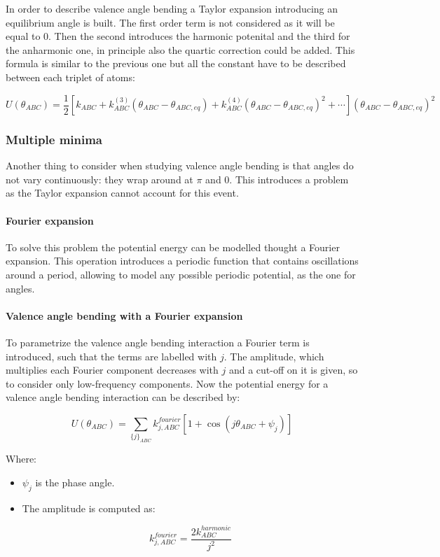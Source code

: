 	In order to describe valence angle bending a Taylor expansion introducing an equilibrium angle is built.
	The first order term is not considered as it will be equal to $0$.
	Then the second introduces the harmonic potenital and the third for the anharmonic one, in principle also the quartic correction could be added.
	This formula is similar to the previous one but all the constant have to be described between each triplet of atoms:

	$$U(\theta_{ABC}) = \frac{1}{2}[k_{ABC}+k^{(3)}_{ABC}(\theta_{ABC}-\theta_{ABC,eq})+k^{(4)}_{ABC}(\theta_{ABC}-\theta_{ABC,eq})^2+\cdots](\theta_{ABC}-\theta_{ABC, eq})^2$$

		\subsubsection{Multiple minima}
		Another thing to consider when studying valence angle bending is that angles do not vary continuously: they wrap around at $\pi$ and $0$.
		This introduces a problem as the Taylor expansion cannot account for this event.

			\paragraph{Fourier expansion}
			To solve this problem the potential energy can be modelled thought a Fourier expansion.
			This operation introduces a periodic function that contains oscillations around a period, allowing to model any possible periodic potential, as the one for angles.

			\paragraph{Valence angle bending with a Fourier expansion}
			To parametrize the valence angle bending interaction a Fourier term is introduced, such that the terms are labelled with $j$.
			The amplitude, which multiplies each Fourier component decreases with $j$ and a cut-off on it is given, so to consider only low-frequency components.
			Now the potential energy for a valence angle bending interaction can be described by:

			$$U(\theta_{ABC}) = \sum\limits_{\{j\}_{ABC}}k^{fourier}_{j,ABC}[1+\cos(j\theta_{ABC}+\psi_j)]$$

			Where:

			\begin{multicols}{2}
			  \begin{itemize}
			    \item $\psi_j$ is the phase angle.
					\item The amplitude is computed as:

						$$k_{j, ABC}^{fourier} = \frac{2k^{harmonic}_{ABC}}{j^2}$$

			  \end{itemize}
			\end{multicols}

